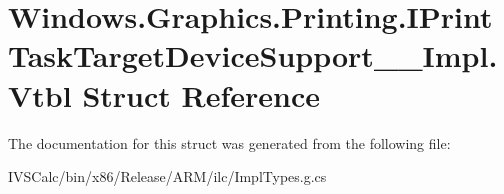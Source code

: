 \hypertarget{struct_windows_1_1_graphics_1_1_printing_1_1_i_print_task_target_device_support_____impl_1_1_vtbl}{}\section{Windows.\+Graphics.\+Printing.\+I\+Print\+Task\+Target\+Device\+Support\+\_\+\+\_\+\+Impl.\+Vtbl Struct Reference}
\label{struct_windows_1_1_graphics_1_1_printing_1_1_i_print_task_target_device_support_____impl_1_1_vtbl}


The documentation for this struct was generated from the following file\+:\begin{DoxyCompactItemize}
\item 
I\+V\+S\+Calc/bin/x86/\+Release/\+A\+R\+M/ilc/Impl\+Types.\+g.\+cs\end{DoxyCompactItemize}
